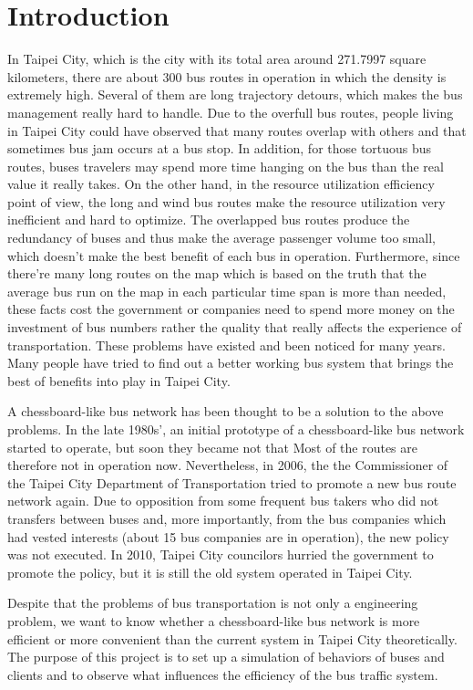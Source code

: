 \documentclass{sig-alternate}
\begin{document}
\section{Introduction}
In Taipei City, which is the city with its total area around 271.7997 square kilometers, there are about 300 bus routes in operation in which the density is extremely high.
Several of them are long trajectory detours, which makes the bus management really hard to handle.
Due to the overfull bus routes, people living in Taipei City could have observed that many routes overlap with others and that sometimes bus jam occurs at a bus stop.
In addition, for those tortuous bus routes, buses travelers may spend more time hanging on the bus than the real value it really takes.
On the other hand, in the resource utilization efficiency point of view, the long and wind bus routes make the resource utilization very inefficient and hard to optimize.
The overlapped bus routes produce the redundancy of buses and thus make the  average passenger volume too small, which doesn't make the best benefit of each bus in operation.
Furthermore, since there're many long routes on the map which is based on the truth that the average bus run on the map in each particular time span is more than needed, these facts cost the government or companies need to spend more money on the investment of bus numbers rather the quality that really affects the experience of transportation.
These problems have existed and been noticed for many years.
Many people have tried to find out a better working bus system that brings the best of benefits into play in Taipei City.

A chessboard-like bus network has been thought to be a solution to the above problems.
In the late 1980s', an initial prototype of a chessboard-like bus network started to operate, but soon they became not that
Most of the routes are therefore not in operation now.
Nevertheless, in 2006, the the Commissioner of the Taipei City Department of Transportation tried to promote a new bus route network again.
Due to opposition from some frequent bus takers who did not transfers between buses and, more importantly, from the bus companies which had vested interests (about 15 bus companies are in operation), the new policy was not executed.
In 2010, Taipei City councilors hurried the government to promote the policy, but it is still the old system operated in Taipei City.

Despite that the problems of bus transportation is not only a engineering problem, we want to know whether a chessboard-like bus network is more efficient or more convenient than the current system in Taipei City theoretically.
The purpose of this project is to set up a simulation of behaviors of buses and clients and to observe what influences the efficiency of the bus traffic system.
\end{document}
